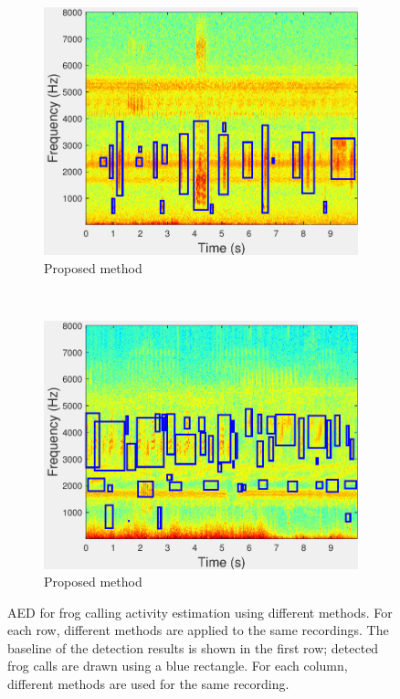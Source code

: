 \begin{figure}
                \begin{subfigure}[b]{0.35\textwidth}
       \includegraphics[width=\textwidth]{image/Ch7/AED_Jie.pdf}
                \caption{Proposed method}
        \end{subfigure}     
~
        \begin{subfigure}[b]{0.35\textwidth}
       \includegraphics[width=\textwidth]{image/Ch7/AED_Jie_2.pdf}
                \caption{Proposed method}
        \end{subfigure}                
        \caption[AED for frog abundance monitoring using different methods]{AED for frog calling activity estimation using different methods. For each row, different methods are applied to the same recordings. The baseline of the detection results is shown in the first row; detected frog calls are drawn using a blue rectangle. For each column, different methods are used for the same recording.}        
        \label{fig:Ch7_AED}
\end{figure}




